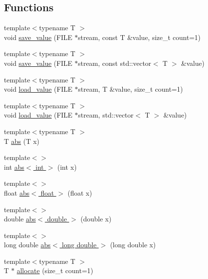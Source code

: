 \subsection*{Functions}
\begin{DoxyCompactItemize}
\item 
{\footnotesize template$<$typename T $>$ }\\void \hyperlink{group__loadsave__grp_gadf909159ea32f125f71328d00ac2de8d}{save\-\_\-value} (F\-I\-L\-E $\ast$stream, const T \&value, size\-\_\-t count=1)
\item 
{\footnotesize template$<$typename T $>$ }\\void \hyperlink{group__loadsave__grp_gac767ee9c25febe0cd6af3ac2e186ffe7}{save\-\_\-value} (F\-I\-L\-E $\ast$stream, const std\-::vector$<$ T $>$ \&value)
\item 
{\footnotesize template$<$typename T $>$ }\\void \hyperlink{group__loadsave__grp_ga81940cd63b9ae619251d612d0ddbc819}{load\-\_\-value} (F\-I\-L\-E $\ast$stream, T \&value, size\-\_\-t count=1)
\item 
{\footnotesize template$<$typename T $>$ }\\void \hyperlink{group__loadsave__grp_gaefed46e8576d6ce3f1796bb13387ad3d}{load\-\_\-value} (F\-I\-L\-E $\ast$stream, std\-::vector$<$ T $>$ \&value)
\item 
{\footnotesize template$<$typename T $>$ }\\T \hyperlink{group__metric__grp_gaf15608f8914516f8d949a8c053d55021}{abs} (T x)
\item 
{\footnotesize template$<$$>$ }\\int \hyperlink{group__metric__grp_ga5c50e8d34773da556210ad34d6157763}{abs$<$ int $>$} (int x)
\item 
{\footnotesize template$<$$>$ }\\float \hyperlink{group__metric__grp_ga3c252a1b86662381fd025b0576124c2d}{abs$<$ float $>$} (float x)
\item 
{\footnotesize template$<$$>$ }\\double \hyperlink{group__metric__grp_ga3fb0513e5af33647f17713a36b10f156}{abs$<$ double $>$} (double x)
\item 
{\footnotesize template$<$$>$ }\\long double \hyperlink{group__metric__grp_ga02cfdf1bf211628b049ffd239a26e57e}{abs$<$ long double $>$} (long double x)
\item 
{\footnotesize template$<$typename T $>$ }\\T $\ast$ \hyperlink{group__memalloc__grp_ga477667da2a8edb1d65f5a7eebaffc1eb}{allocate} (size\-\_\-t count=1)
\end{DoxyCompactItemize}
